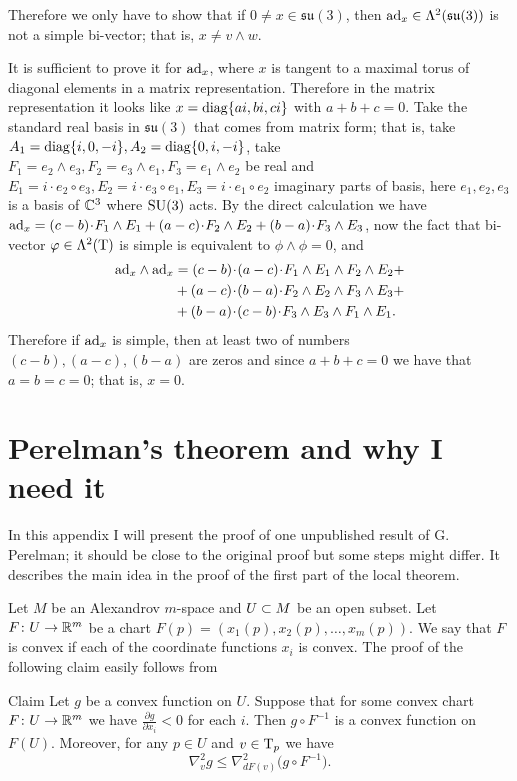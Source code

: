 \documentclass{article}
\begin{document}
Therefore we only have  to show that if $0\neq x\in \mathfrak{su}(3)$, then
$\mathrm{ad}_x\in \Lambda^2(\mathfrak{su}(3))$ is not a simple bi-vector; that is, $x\neq
v\wedge w$.

It is sufficient to prove it for $\mathrm{ad}_x$, where $x$ is tangent to a
maximal torus of diagonal elements in a matrix representation.
Therefore in the matrix representation it looks like
$x=\mathrm{diag}\{ai,bi,ci\}$ with $a+b+c=0$. Take the standard real basis
in $\mathfrak{su}(3)$ that comes from matrix form;
that is, take
 $A_1\z=\diag \{i,0,-i\},A_2=\diag \{0,i,-i\}$, take
 $F_1=e_2\wedge e_3,F_2= e_3\wedge e_1,F_3=e_1\wedge e_2$ be real and
$E_1=i\cdot e_2\circ e_3,E_2=i\cdot e_3\circ e_1,E_3=i\cdot e_1\circ e_2$
imaginary parts of basis, here $e_1,e_2,e_3$ is a basis of $\mathbb{C}^3$
where $\text{\rm SU}(3)$ acts.
By the direct calculation we have
$\ad_x=(c-b)\cdot F_1\wedge E_1+(a-c)\cdot F_2\wedge E_2 + (b-a)\cdot  F_3\wedge E_3$,
now the fact that bi-vector $\varphi\in \Lambda^2(\text{\rm T})$
is simple is equivalent to $\phi\wedge\phi=0$, and
\begin{align*}
\ad_x\wedge \ad_x&=(c-b)\cdot(a-c)\cdot F_1\wedge E_1\wedge F_2\wedge E_2+
\\
&+(a-c)\cdot(b-a)\cdot F_2\wedge E_2\wedge F_3\wedge E_3+
\\
&+(b-a)\cdot(c-b)\cdot F_3\wedge E_3\wedge F_1\wedge E_1.
\end{align*}
Therefore if $\mathrm{ad}_x$ is simple, then at least two
of numbers $(c-b),(a-c),(b-a)$ are zeros
and since $a+b+c=0$ we have that  $a=b=c=0$; that is, $x=0$. \qeds



\section{Perelman's theorem and why I need it}\label{appendix:B}


In this appendix I will present the proof of one unpublished
result of G. Perelman;
it should be close to the original proof but some steps might differ.
It describes the main idea in the proof of the first part of the local theorem.

Let $M$ be an Alexandrov $m$-space and $U\subset M$ be an open subset.
Let $F\colon U\to \mathbb{R}^m$ be a chart $F(p)=(x_1(p),x_2(p),\dots,x_m(p))$.
We say that $F$ is convex if each of the coordinate functions $x_i$
is convex.
The proof of the following claim easily follows from \cite[Proposition 3]{Per}


\begin{thm}{Claim}
Let $g$ be a convex function on $U$.
Suppose that for some
convex chart $F\colon U\to \mathbb{R}^m$ we have $\tfrac{\partial g}{\partial x_i}< 0$ for each $i$.
Then $g\circ F^{-1}$ is a convex function on $F(U)$. Moreover, for
any $p\in U$ and  $v\in \text{\rm T}_p$ we have
$$\nabla^2_vg\le\nabla^2_{dF(v)}\bigl(g\circ F^{-1}\bigr).$$
\end{thm}
\end{document}
